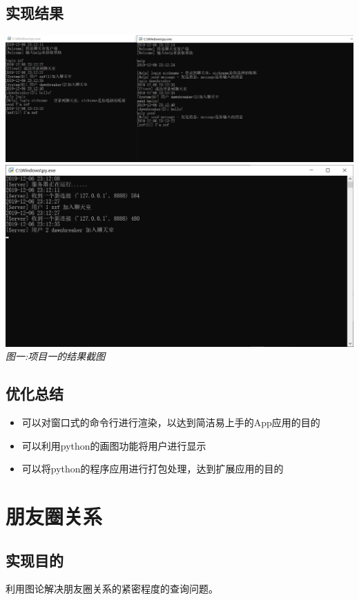 \documentclass[UTF8,a4paper]{article}
\begin{document}
\subsection{实现结果}
\begin{center}
\includegraphics[scale=0.3]{chat/image/A.png}\\
\includegraphics[scale=0.35]{chat/image/B.png}\\
\textit{图一:项目一的结果截图}\\
\end{center}
\subsection{优化总结}
\begin{itemize}
    \item 可以对窗口式的命令行进行渲染，以达到简洁易上手的App应用的目的
    \item 可以利用python的画图功能将用户进行显示
    \item 可以将python的程序应用进行打包处理，达到扩展应用的目的
\end{itemize}
\section{朋友圈关系}
\subsection{实现目的}
利用图论解决朋友圈关系的紧密程度的查询问题。
\end{document}
